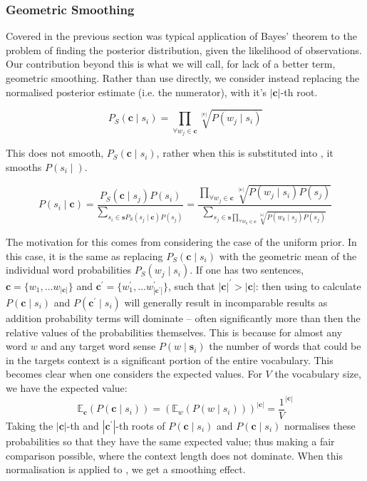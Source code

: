 \documentclass{sig-alternate}
\renewcommand{\c}{\mathbf{c}}
\newcommand{\s}{\mathbf{s}}
\begin{document}
\subsubsection{Geometric Smoothing}
Covered in the previous section was typical application of Bayes' theorem to the problem of finding the posterior distribution, given the likelihood of observations.
Our contribution beyond this is what we will call, for lack of a better term, geometric smoothing.
Rather than use  directly, we consider instead replacing the normalised posterior estimate (i.e. the numerator), with it's $|\c|$-th root.

\begin{equation} \label{eq:contrextprobsmooth}
P_S(\c \mid s_{i})=\prod_{\forall w_{j}\in\c}\sqrt[|\c|]{P(w_{j} \mid s_{i})}
\end{equation}

This does not smooth, $P_S(\c \mid s_{i})$, rather when this is substituted into , it smooths $P(s_{i} \mid )$.

\begin{equation} \label{eq:generalwsdsmoothed}
P(s_{i}\mid\c)=\dfrac{P_{S}(\c\mid s_{j})P(s_{i})}{\sum_{s_{i}\in\s P_{S}(s_{j}\mid\c)P(s_{j})}}=\dfrac{\prod_{\forall w_{j}\in\c}\sqrt[|\c|]{P(w_{j}\mid s_{i})P(s_{j})}}{\sum_{s_{j}\in\s\prod_{\forall w_{k}\in\c}\sqrt[|\c|]{P(w_{k}\mid s_{j})P(s_{j})}}}
\end{equation}

The motivation for this comes from considering the case of the uniform prior.
In this case, it is the same as replacing $P_S(\c \mid s_{i})$ with the geometric mean of the individual word probabilities $P_S(w_j \mid s_{i})$. 
If one has two sentences, $\c=\{w_1,...w_{|\c|}\}$ and $\c^\prime=\{w_1^\prime,...w^\prime_{|\c^\prime|}\}$, such that $|\c|^\prime > |\c|$:
then using  to calculate $P(\c \mid s_{i})$ and $P(\c^\prime \mid s_{i})$ will generally result in incomparable results as addition probability terms will dominate -- often significantly more than then the relative values of the probabilities themselves. This is because for almost any word $w$ and any target word sense $P(w \mid \s_i)$ the number of words that could be in the targets context is a significant portion of the entire vocabulary.
This becomes clear when one considers the expected values. For $V$ the vocabulary size, we have the expected value:
\begin{equation} \label{eq:expectcontexprob}
\mathbb{E}_\c(P(\c \mid s_{i}))
=(\mathbb{E}_w(P(w \mid s_i)))^{|\c|}
= \frac{1}{V}^{|\c|}
\end{equation}
Taking the $|\c|$-th and $|\c^\prime|$-th roots of $P(\c \mid s_{i})$ and $P(\c \mid s_{i})$ normalises these probabilities so that they have the same expected value; thus making a fair comparison possible, where the context length does not dominate.
When this normalisation is applied to , we get a smoothing effect.
\end{document}
